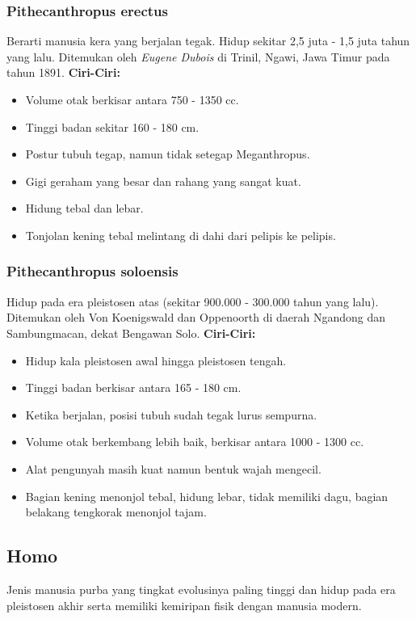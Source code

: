 \documentclass[12pt, a4paper]{article}
\begin{document}
\subsubsection{Pithecanthropus erectus}
Berarti manusia kera yang berjalan tegak. Hidup sekitar 2,5 juta - 1,5 juta tahun yang lalu. Ditemukan oleh \textit{Eugene Dubois} di Trinil, Ngawi, Jawa Timur pada tahun 1891.
\noindent \textbf{Ciri-Ciri:}
\begin{itemize}
	\item Volume otak berkisar antara 750 - 1350 cc.
	\item Tinggi badan sekitar 160 - 180 cm.
	\item Postur tubuh tegap, namun tidak setegap Meganthropus.
	\item Gigi geraham yang besar dan rahang yang sangat kuat.
	\item Hidung tebal dan lebar.
	\item Tonjolan kening tebal melintang di dahi dari pelipis ke pelipis.
\end{itemize}

\subsubsection{Pithecanthropus soloensis}
Hidup pada era pleistosen atas (sekitar 900.000 - 300.000 tahun yang lalu). Ditemukan oleh Von Koenigswald dan Oppenoorth di daerah Ngandong dan Sambungmacan, dekat Bengawan Solo.
\noindent \textbf{Ciri-Ciri:}
\begin{itemize}
	\item Hidup kala pleistosen awal hingga pleistosen tengah.
	\item Tinggi badan berkisar antara 165 - 180 cm.
	\item Ketika berjalan, posisi tubuh sudah tegak lurus sempurna.
	\item Volume otak berkembang lebih baik, berkisar antara 1000 - 1300 cc.
	\item Alat pengunyah masih kuat namun bentuk wajah mengecil.
	\item Bagian kening menonjol tebal, hidung lebar, tidak memiliki dagu, bagian belakang tengkorak menonjol tajam.
\end{itemize}

\subsection{Homo}
Jenis manusia purba yang tingkat evolusinya paling tinggi dan hidup pada era pleistosen akhir serta memiliki kemiripan fisik dengan manusia modern.
\end{document}
